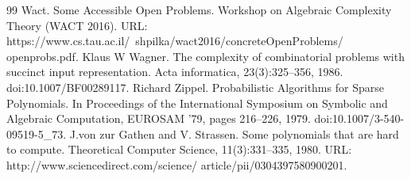 \documentclass[10pt,a4paper]{article}
\begin{document}
\begin{thebibliography}{99}
 Wact. Some Accessible Open Problems. Workshop on Algebraic Complexity Theory (WACT 2016).   URL: https://www.cs.tau.ac.il/~shpilka/wact2016/concreteOpenProblems/ openprobs.pdf.
 Klaus W Wagner. The complexity of combinatorial problems with succinct input representation. Acta informatica, 23(3):325–356, 1986. doi:10.1007/BF00289117.
 Richard Zippel. Probabilistic Algorithms for Sparse Polynomials. In Proceedings of the International Symposium on Symbolic and Algebraic Computation, EUROSAM ’79, pages 216–226, 1979. doi:10.1007/3-540-09519-5\_73.
 J.von zur Gathen and V. Strassen. Some polynomials that are hard to compute. Theoretical Computer Science, 11(3):331–335, 1980. URL: http://www.sciencedirect.com/science/ article/pii/0304397580900201.
\end{thebibliography}
\end{document}

